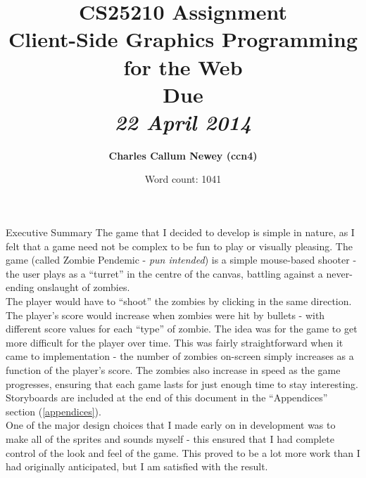 \documentclass[11pt]{article}
\title{
\vspace{2in}
\textmd{\textbf{CS25210 Assignment \\ Client-Side Graphics Programming for the Web}}\\
\normalsize\vspace{0.1in}\small{Due}\\
\vspace{0.1in}\large{\textit{22 April 2014}}
\vspace{3in}
}
\author{\textbf{Charles Callum Newey (ccn4)}}
\date{Word count: 1041}
\begin{document}
\maketitle
\newpage
\tableofcontents
\newpage

\begin{section}{Executive Summary}
    The game that I decided to develop is simple in nature, as I felt that a game need not be complex to be fun to play or visually pleasing. The game (called Zombie Pendemic - \textit{pun intended}) is a simple mouse-based shooter - the user plays as a ``turret'' in the centre of the canvas, battling against a never-ending onslaught of zombies. \\
    
    The player would have to ``shoot'' the zombies by clicking in the same direction. The player's score would increase when zombies were hit by bullets - with different score values for each ``type'' of zombie. The idea was for the game to get more difficult for the player over time. This was fairly straightforward when it came to implementation - the number of zombies on-screen simply increases as a function of the player's score. The zombies also increase in speed as the game progresses, ensuring that each game lasts for just enough time to stay interesting. Storyboards are included at the end of this document in the ``Appendices'' section (\ref{appendices}). \\
    
    One of the major design choices that I made early on in development was to make all of the sprites and sounds myself - this ensured that I had complete control of the look and feel of the game. This proved to be a lot more work than I had originally anticipated, but I am satisfied with the result.
\end{section}
\end{document}
